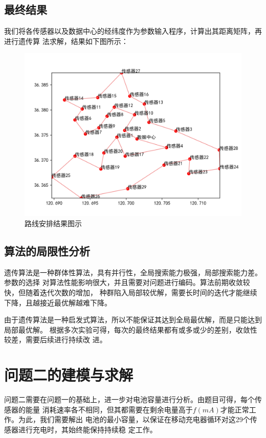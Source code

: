 \documentclass{ctexart}
\begin{document}
    \subsection{最终结果}
    我们将各传感器以及数据中心的经纬度作为参数输入程序，计算出其距离矩阵，再进行遗传算
    法求解，结果如下图所示：
    \begin{figure}[H]
        \centering
        \includegraphics[width=1\textwidth]{figure/path.png}
        \caption {路线安排结果图示}
    \end{figure}

    \subsection{算法的局限性分析}
    遗传算法是一种群体性算法，具有并行性，全局搜索能力极强，局部搜索能力差。参数的选择
    对算法性能影响很大，并且需要对问题进行编码。算法前期收敛较快，但随着迭代次数的增加，
    种群陷入局部较优解，需要长时间的迭代才能继续下降，且越接近最优解越难下降。

    由于遗传算法是一种启发式算法，所以不能保证其达到全局最优解，而是只能达到局部最优解。
    根据多次实验可得，每次的最终结果都有或多或少的差别，收敛性较差，需要后续进行持续改
    进。

    \section{问题二的建模与求解}
    问题二需要在问题一的基础上，进一步对电池容量进行分析。由题目可得，每个传感器的能量
    消耗速率各不相同，但其都需要在剩余电量高于$f(mA)$才能正常工作。为此，我们需要解出
    电池的最小容量，以保证在移动充电器循环对这29个传感器进行充电时，其始终能保持持续稳
    定工作。
\end{document}
